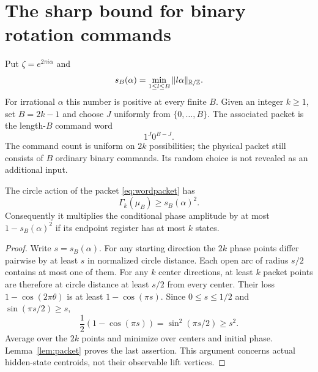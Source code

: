 \section{The sharp bound for binary rotation commands}\label{sec:sharp}
Put $\zeta=e^{2\pi i\alpha}$ and
\begin{equation}\label{eq:separation}
 s_B(\alpha)=\min_{1\le l\le B}\|l\alpha\|_{\mathbb R/\mathbb Z}.
\end{equation}
For irrational $\alpha$ this number is positive at every finite $B$.
Given an integer $k\ge1$, set $B=2k-1$ and choose $J$ uniformly from
$\{0,\ldots,B\}$. The associated packet is the length-$B$ command word
\begin{equation}\label{eq:wordpacket}
                         1^J0^{B-J}.
\end{equation}
The command count is uniform on $2k$ possibilities; the physical packet
still consists of $B$ ordinary binary commands. Its random choice is not
revealed as an additional input.

\begin{lemma}\label{lem:separated}
The circle action of the packet \eqref{eq:wordpacket} has
\begin{equation}\label{eq:circle-cost}
 \Gamma_k(\mu_B)\ge s_B(\alpha)^2.
\end{equation}
Consequently it multiplies the conditional phase amplitude by at most
$1-s_B(\alpha)^2$ if its endpoint register has at most $k$ states.
\end{lemma}
\begin{proof}
Write $s=s_B(\alpha)$. For any starting direction the $2k$ phase
points differ pairwise by at least $s$ in normalized circle distance.
Each open arc of radius $s/2$ contains at most one of them. For any
$k$ center directions, at least $k$ packet points are therefore at
circle distance at least $s/2$ from every center. Their loss
$1-\cos(2\pi\theta)$ is at least $1-\cos(\pi s)$. Since $0\le s\le1/2$
and $\sin(\pi s/2)\ge s$,
\[
 \frac12(1-\cos(\pi s))=\sin^2(\pi s/2)\ge s^2.
\]
Average over the $2k$ points and minimize over centers and initial phase.
Lemma~\ref{lem:packet} proves the last assertion. This argument concerns
actual hidden-state centroids, not their observable lift vertices.
\end{proof}

